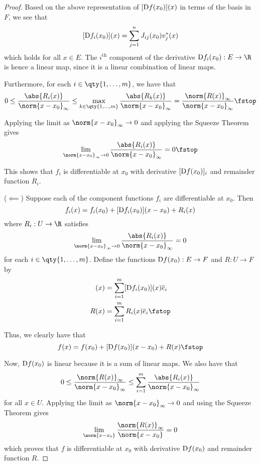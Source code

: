 \begin{proof}
  Based on the above representation of \( [\text{D} f(x_0)](x) \) in terms of the basis in \( F \), we see that
  \[ [\text{D} f_i(x_0)](x)=\sum_{j=1}^nJ_{ij}(x_0)v_j^*(x) \]
  which holds for all \( x\in E \). The \( i^{\text{th}} \) component of the derivative \( \D f_i(x_0):E\to\R \) is hence a linear map, since it is a linear combination of linear maps.

  \vspace{3mm}

  Furthermore, for each \( i\in\qty{1,\dots, m} \), we have that
  \[ 0\leq\frac{\abs{R_i(x)}}{\norm{x-x_0}_\infty}\leq\max_{k\in\qty{1,\dots,m}}\frac{\abs{R_k(x)}}{{\norm{x-x_0}_\infty}}=\frac{\norm{R(x)}_\infty}{{\norm{x-x_0}_\infty}}\fstop \]

  Applying the limit as \( \norm{x-x_0}_\infty\to 0 \) and applying the Squeeze Theorem gives
  \[ \lim_{\norm{x-x_0}_\infty\to 0}\frac{\abs{R_i(x)}}{\norm{x-x_0}_\infty}=0\fstop \]

  This shows that \( f_i \) is differentiable at \( x_0 \) with derivative \( [\text{D} f(x_0)]_i \) and remainder function \( R_i \).

  \vspace{3mm}

  (\( \impliedby \)) Suppose each of the component functions \( f_i \) are differentiable at \( x_0 \). Then
  \[ f_i(x)=f_i(x_0)+[\text{D} f_i(x_0)](x-x_0)+R_i(x) \]
  where \( R_i:U\to\R \) satisfies
  \[ \lim_{\norm{x-x_0}_\infty\to 0}\frac{\abs{R_i(x)}}{\norm{x-x_0}_\infty}=0 \]
  for each \( i\in\qty{1,\dots,m} \). Define the functions \( \text{D} f(x_0):E\to F \) and \( R:U\to F \) by
  \begin{align*}
    [\D f(x_0)](x)&= \sum_{i=1}^m[\D f_i(x_0)](x)\overline{e}_i\\
    R(x)&= \sum_{i=1}^m R_i(x)\overline{e}_i\fstop
  \end{align*}

  Thus, we clearly have that
  \[ f(x)=f(x_0)+[\D f(x_0)](x-x_0)+R(x)\fstop \]

  Now, \( \text{D} f(x_0) \) is linear because it is a sum of linear maps. We also have that
  \[ 0\leq\frac{\norm{R(x)}_\infty}{\norm{x-x_0}_\infty}\leq\sum_{i=1}^m\frac{\abs{R_i(x)}}{\norm{x-x_0}_\infty} \]
  for all \( x\in U \). Applying the limit as \( \norm{x-x_0}_\infty\to 0 \) and using the Squeeze Theorem gives
  \[ \lim_{\norm{x-x_0}}\frac{\norm{R(x)}_\infty}{\norm{x-x_0}}=0 \]
  which proves that \( f \) is differentiable at \( x_0 \) with derivative \( \text{D} f(x_0) \) and remainder function \( R \).
\end{proof}

